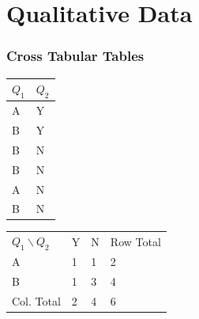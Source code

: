 \section{Qualitative Data}

\begin{frame}
  \frametitle{Cross Tabular Tables}

  \begin{tabular}{ll}
    $Q_{1}$ & $Q_{2}$ \\ \hline
    A & Y \\
    B & Y \\
    B & N \\
    B & N \\
    A & N \\
    B & N
  \end{tabular}

  {
    \begin{tabular}{l|l|l|l}
      $Q_1 \backslash Q_2$ & Y & N & Row Total \\
      A & 1 & 1 & 2 \\ \hline
      B & 1 & 3 & 4 \\ \hline
      Col. Total & 2 & 4 & 6
    \end{tabular}
  }

\end{frame}



